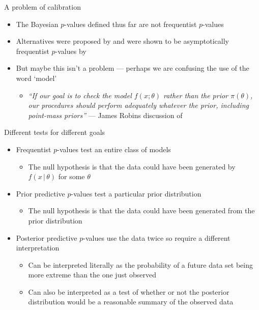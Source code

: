 \begin{frame}{A problem of calibration}
  \begin{itemize}
    \item The Bayesian $p$-values defined thus far are not frequentist $p$-values
    \vspace{\baselineskip}
    \pause
    \item Alternatives were proposed by \cite{Bayarri1999-ty} and were shown to be asymptotically frequentist $p$-values by \cite{Robins2000-oz}
    \vspace{\baselineskip}
    \pause
    \item But maybe this isn't a problem --- perhaps we are confusing the use of the word `model'
    \begin{itemize}
      \item \textit{``If our goal is to check the model $f(x;\theta)$ rather than the prior $\pi(\theta)$, our procedures should perform adequately whatever the prior, including point-mass priors''} --- James Robins discussion of \cite{Bayarri1999-ty}
    \end{itemize}
  \end{itemize}
\end{frame}

\begin{frame}{Different tests for different goals}
  \begin{itemize}
    \item Frequentist $p$-values test an entire class of models
    \begin{itemize}
      \item The null hypothesis is that the data could have been generated by $f(x\,|\,\theta)$ for some $\theta$
    \end{itemize}
    \vspace{\baselineskip}
    \pause
    \item Prior predictive $p$-values test a particular prior distribution
    \begin{itemize}
      \item The null hypothesis is that the data could have been generated from the prior distribution
    \end{itemize}
    \vspace{\baselineskip}
    \pause
    \item Posterior predictive $p$-values use the data twice so require a different interpretation
    \begin{itemize}
      \item Can be interpreted literally as the probability of a future data set being more extreme than the one just observed
      \item Can also be interpreted as a test of whether or not the posterior distribution would be a reasonable summary of the observed data
    \end{itemize}
  \end{itemize}
\end{frame}

